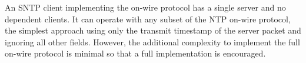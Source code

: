 An SNTP client implementing the on-wire protocol has a single server
and no dependent clients.  It can operate with any subset of the NTP
on-wire protocol, the simplest approach using only the transmit
timestamp of the server packet and ignoring all other fields.
However, the additional complexity to implement the full on-wire
protocol is minimal so that a full implementation is encouraged.
